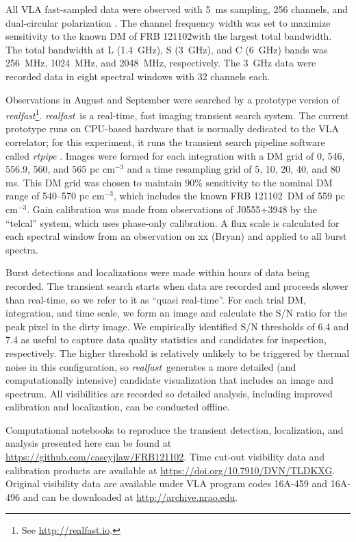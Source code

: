 \documentclass[twocolumn]{aastex61}
\newcommand{\rf}{\emph{realfast}}
\newcommand{\frb}{FRB 121102}
\begin{document}
All VLA fast-sampled data were observed with 5~ms sampling, 256 channels, and dual-circular polarization \citep{2015ApJ...807...16L}. The channel frequency width was set to maximize sensitivity to the known DM of \frb with the largest total bandwidth. The total bandwidth at L (1.4~GHz), S (3~GHz), and C (6~GHz) bands was 256~MHz, 1024~MHz, and 2048~MHz, respectively. The 3~GHz data were recorded data in eight spectral windows with 32 channels each.

Observations in August and September were searched by a prototype version of \rf\footnote{See \url{http://realfast.io}.}. \rf\ is a real-time, fast imaging transient search system. The current prototype runs on CPU-based hardware that is normally dedicated to the VLA correlator; for this experiment, it runs the transient search pipeline software called \emph{rtpipe} \citep[\url{https://github.com/caseyjlaw/rtpipe};][]{2015ApJ...807...16L}. Images were formed for each integration with a DM grid of 0, 546, 556.9, 560, and 565 pc cm$^{-3}$ and a time resampling grid of 5, 10, 20, 40, and 80 ms. This DM grid was chosen to maintain 90\% sensitivity to the nominal DM range of 540--570 pc cm$^{-3}$, which includes the known \frb\ DM of 559 pc cm$^{-3}$. Gain calibration was made from observations of J0555+3948 by the ``telcal'' system, which uses phase-only calibration. A flux scale is calculated for each spectral window from an observation on {\color{red}xx (Bryan)} and applied to all burst spectra.

Burst detections and localizations were made within hours of data being recorded. The transient search starts when data are recorded and proceeds slower than real-time, so we refer to it as ``quasi real-time''. For each trial DM, integration, and time scale, we form an image and calculate the S/N ratio for the peak pixel in the dirty image. We empirically identified S/N thresholds of 6.4 and 7.4 as useful to capture data quality statistics and candidates for inspection, respectively. The higher threshold is relatively unlikely to be triggered by thermal noise in this configuration, so \rf\ generates a more detailed (and computationally intensive) candidate visualization that includes an image and spectrum. All visibilities are recorded so detailed analysis, including improved calibration and localization, can be conducted offline. 

Computational notebooks to reproduce the transient detection, localization, and analysis presented here can be found at \url{https://github.com/caseyjlaw/FRB121102}. Time cut-out visibility data and calibration products are available at \url{https://doi.org/10.7910/DVN/TLDKXG}. Original visibility data are available under VLA program codes 16A-459 and 16A-496 and can be downloaded at \url{http://archive.nrao.edu}.
\end{document}
